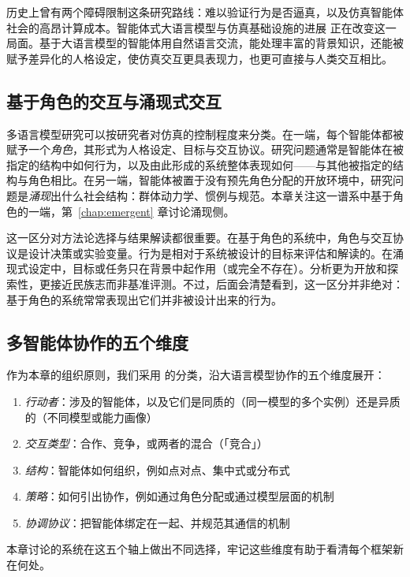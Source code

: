 历史上曾有两个障碍限制这条研究路线：难以验证行为是否逼真，以及仿真智能体社会的高昂计算成本。智能体式大语言模型与仿真基础设施的进展 \citep{rutherford2024jaxmarl} 正在改变这一局面。基于大语言模型的智能体用自然语言交流，能处理丰富的背景知识，还能被赋予差异化的人格设定，使仿真交互更具表现力，也更可直接与人类交互相比。

\subsection{基于角色的交互与涌现式交互}
多语言模型研究可以按研究者对仿真的控制程度来分类。在一端，每个智能体都被赋予一个\emph{角色}，其形式为人格设定、目标与交互协议。研究问题通常是智能体在被指定的结构中如何行为，以及由此形成的系统整体表现如何——与其他被指定的结构与角色相比。在另一端，智能体被置于没有预先角色分配的开放环境中，研究问题是\emph{涌现}出什么社会结构：群体动力学、惯例与规范。本章关注这一谱系中基于角色的一端，第~\ref{chap:emergent} 章讨论涌现侧。

这一区分对方法论选择与结果解读都很重要。在基于角色的系统中，角色与交互协议是设计决策或实验变量。行为是相对于系统被设计的目标来评估和解读的。在涌现式设定中，目标或任务只在背景中起作用（或完全不存在）。分析更为开放和探索性，更接近民族志而非基准评测。不过，后面会清楚看到，这一区分并非绝对：基于角色的系统常常表现出它们并非被设计出来的行为。

\subsection{多智能体协作的五个维度} \label{fivedimensions}
作为本章的组织原则，我们采用 \citet{tran2025multi} 的分类，沿大语言模型协作的五个维度展开：
\begin{enumerate}
    \item \emph{行动者}：涉及的智能体，以及它们是同质的（同一模型的多个实例）还是异质的（不同模型或能力画像）
    \item \emph{交互类型}：合作、竞争，或两者的混合（「竞合」）
    \item \emph{结构}：智能体如何组织，例如点对点、集中式或分布式
    \item \emph{策略}：如何引出协作，例如通过角色分配或通过模型层面的机制
    \item \emph{协调协议}：把智能体绑定在一起、并规范其通信的机制
\end{enumerate}
本章讨论的系统在这五个轴上做出不同选择，牢记这些维度有助于看清每个框架新在何处。

